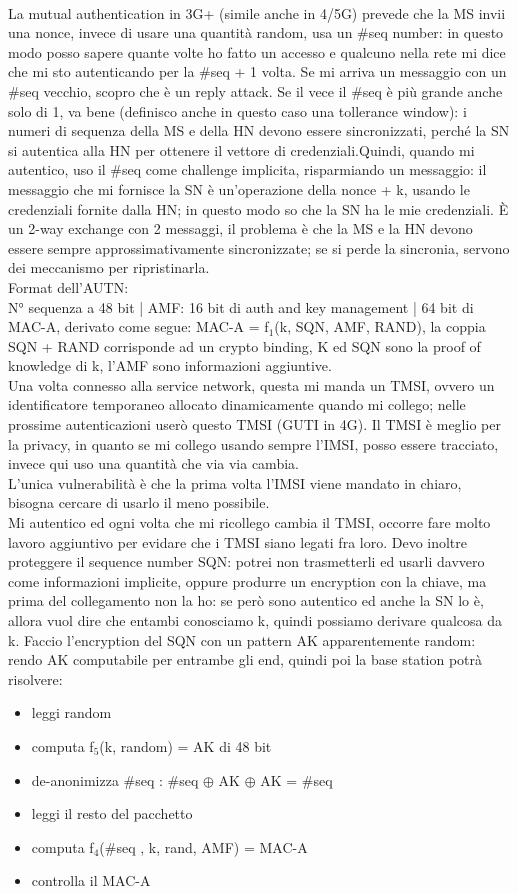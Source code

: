 \documentclass[16px]{article}
\begin{document}
\\ La mutual authentication in 3G+ (simile anche in 4/5G) prevede che la MS invii una nonce, invece di usare una quantità random, usa un \#seq number: in questo modo posso sapere quante volte ho fatto un accesso e qualcuno nella rete mi dice che mi sto autenticando per la \#seq + 1 volta. Se mi arriva un messaggio con un \#seq vecchio, scopro che è un reply attack. Se il vece il \#seq è più grande anche solo di 1, va bene (definisco anche in questo caso una tollerance window): i numeri di sequenza della MS e della HN devono essere sincronizzati, perché la SN si autentica alla HN per ottenere il vettore di credenziali.Quindi, quando mi autentico, uso il \#seq come challenge implicita, risparmiando un messaggio: il messaggio che mi fornisce la SN è un'operazione della nonce + k, usando le credenziali fornite dalla HN; in questo modo so che la SN ha le mie credenziali. È un 2-way exchange con 2 messaggi, il problema è che la MS e la HN devono essere sempre approssimativamente sincronizzate; se si perde la sincronia, servono dei meccanismo per ripristinarla.\\ Format dell'AUTN:\\
N° sequenza a 48 bit | AMF: 16 bit di auth and key management | 64 bit di MAC-A, derivato come segue: MAC-A = f$_{1}$(k, SQN, AMF, RAND), la coppia SQN + RAND corrisponde ad un crypto binding, K ed SQN sono la proof of knowledge di k, l'AMF sono informazioni aggiuntive.\\ Una volta connesso alla service network, questa mi manda un TMSI, ovvero un identificatore temporaneo allocato dinamicamente quando mi collego; nelle prossime autenticazioni userò questo TMSI (GUTI in 4G). Il TMSI è meglio per la privacy, in quanto se mi collego usando sempre l'IMSI, posso essere tracciato, invece qui uso una quantità che via via cambia.\\ L'unica vulnerabilità è che la prima volta l'IMSI viene mandato in chiaro, bisogna cercare di usarlo il meno possibile.\\ Mi autentico ed ogni volta che mi ricollego cambia il TMSI, occorre fare molto lavoro aggiuntivo per evidare che i TMSI siano legati fra loro. Devo inoltre proteggere il sequence number SQN: potrei non trasmetterli ed usarli davvero come informazioni implicite, oppure produrre un encryption con la chiave, ma prima del collegamento non la ho: se però sono autentico ed anche la SN lo è, allora vuol dire che entambi conosciamo k, quindi possiamo derivare qualcosa da k. Faccio l'encryption del SQN con un pattern AK apparentemente random: rendo AK computabile per entrambe gli end, quindi poi la base station potrà risolvere:
\begin{itemize}
\item leggi random
\item computa f$_{5}$(k, random) = AK di 48 bit
\item de-anonimizza \#seq : \#seq $\oplus$ AK $\oplus$ AK = \#seq
\item  leggi il resto del pacchetto
\item computa f$_{4}$(\#seq , k, rand, AMF) = MAC-A
\item controlla il MAC-A 
\end{itemize}
\end{document}
